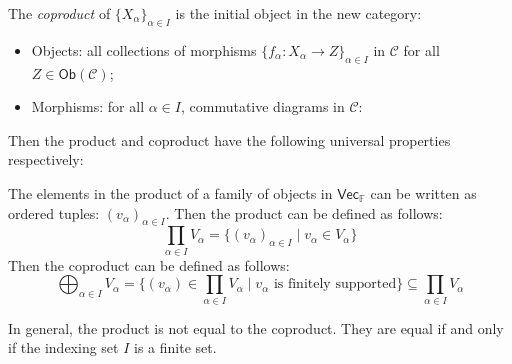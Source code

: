 \documentclass[
	11pt, %
	fleqn, %
	a4paper, %
]{LegrandOrangeBook}
\newcommand{\F}{\mathbb{F}} %
\newcommand{\C}{\mathcal{C}} %
\newcommand{\Vect}{\boldsymbol{\mathsf{Vec}}} %
\newcommand{\Ob}[1]{\mathsf{Ob}(#1)} %
\DeclareRobustCommand{\coprod}{\mathop{\text{\fakecoprod}}}
\newcommand{\fakecoprod}{%
    \sbox0{$\prod$}%
    \smash{\raisebox{\dimexpr.9625\depth-\dp0}{\scalebox{1}[-1]{$\prod$}}}%
    \vphantom{$\prod$}%
}
\begin{document}
The \emph{coproduct} of $\{ X_{\alpha} \}_{\alpha \in I}$ is the initial object in the new category:
\begin{itemize}
    \item Objects: all collections of morphisms $\{ f_{\alpha} : X_{\alpha} \to Z \}_{\alpha \in I}$ in $\C$ for all $Z \in \Ob{\C}$;
    \item Morphisms: for all $\alpha \in I$, commutative diagrams in $\C$:
\end{itemize}
\begin{center}
\end{center}

Then the product and coproduct have the following universal properties respectively:
\begin{center}
    \qquad
\end{center}

The elements in the product of a family of objects in $\Vect_{\F}$ can be written as ordered tuples: $(v_\alpha)_{\alpha \in I}$. Then the product can be defined as follows:
\[
    \prod_{\alpha \in I} V_\alpha = \{ (v_\alpha)_{\alpha \in I} \mid v_\alpha \in V_\alpha \}
\]
Then the coproduct can be defined as follows:
\[
    \bigoplus_{\alpha \in I} V_\alpha = \{ (v_\alpha) \in \prod_{\alpha \in I} V_\alpha \mid v_\alpha \text{ is finitely supported} \} \subseteq \prod_{\alpha \in I} V_\alpha
\]
\begin{remark}
    In general, the product is not equal to the coproduct. They are equal if and only if the indexing set $I$ is a finite set.
\end{remark}
\end{document}
